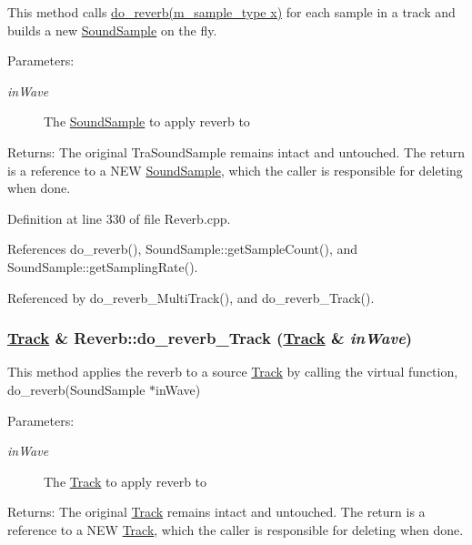 This method calls \hyperlink{classReverb_a6}{do\_\-reverb(m\_\-sample\_\-type x)} for each sample in a track and builds a new \hyperlink{classSoundSample}{Sound\-Sample} on the fly. \begin{Desc}
\item[Parameters:]
\begin{description}
\item[{\em in\-Wave}]The \hyperlink{classSoundSample}{Sound\-Sample} to apply reverb to \end{description}
\end{Desc}
\begin{Desc}
\item[Returns:]The original Tra\-Sound\-Sample remains intact and untouched. The return is a reference to a NEW \hyperlink{classSoundSample}{Sound\-Sample}, which the caller is responsible for deleting when done. \end{Desc}


Definition at line 330 of file Reverb.cpp.

References do\_\-reverb(), Sound\-Sample::get\-Sample\-Count(), and Sound\-Sample::get\-Sampling\-Rate().

Referenced by do\_\-reverb\_\-Multi\-Track(), and do\_\-reverb\_\-Track().\hypertarget{classReverb_a9}{
\subsubsection[do\_\-reverb\_\-Track]{\setlength{\rightskip}{0pt plus 5cm}\hyperlink{classTrack}{Track} \& Reverb::do\_\-reverb\_\-Track (\hyperlink{classTrack}{Track} \& {\em in\-Wave})}}
\label{classReverb_a9}


This method applies the reverb to a source \hyperlink{classTrack}{Track} by calling the virtual function, do\_\-reverb(Sound\-Sample $\ast$in\-Wave) \begin{Desc}
\item[Parameters:]
\begin{description}
\item[{\em in\-Wave}]The \hyperlink{classTrack}{Track} to apply reverb to \end{description}
\end{Desc}
\begin{Desc}
\item[Returns:]The original \hyperlink{classTrack}{Track} remains intact and untouched. The return is a reference to a NEW \hyperlink{classTrack}{Track}, which the caller is responsible for deleting when done. \end{Desc}


